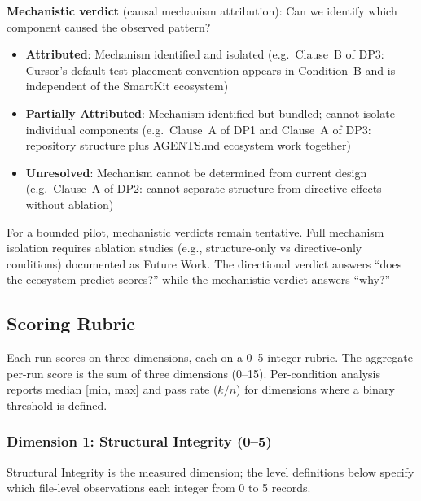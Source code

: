 \documentclass[12pt,a4paper]{report}
\begin{document}
\textbf{Mechanistic verdict} (causal mechanism attribution): Can we identify which component caused the observed pattern?
\begin{itemize}
    \item \textbf{Attributed}: Mechanism identified and isolated (e.g.\ Clause~B of DP3: Cursor's default test-placement convention appears in Condition~B and is independent of the SmartKit ecosystem)
    \item \textbf{Partially Attributed}: Mechanism identified but bundled; cannot isolate individual components (e.g.\ Clause~A of DP1 and Clause~A of DP3: repository structure plus AGENTS.md ecosystem work together)
    \item \textbf{Unresolved}: Mechanism cannot be determined from current design (e.g.\ Clause~A of DP2: cannot separate structure from directive effects without ablation)
\end{itemize}

For a bounded pilot, mechanistic verdicts remain tentative. Full mechanism isolation requires ablation studies (e.g., structure-only vs directive-only conditions) documented as Future Work. The directional verdict answers ``does the ecosystem predict scores?'' while the mechanistic verdict answers ``why?''

\subsection{Scoring Rubric}
\label{sec:pilot-rubric}

Each run scores on three dimensions, each on a 0--5 integer rubric. The aggregate per-run score is the sum of three dimensions (0--15). Per-condition analysis reports median [min, max] and pass rate ($k/n$) for dimensions where a binary threshold is defined.

\subsubsection{Dimension 1: Structural Integrity (0--5)}

Structural Integrity is the measured dimension; the level definitions below specify which file-level observations each integer from 0 to 5 records.
\end{document}
